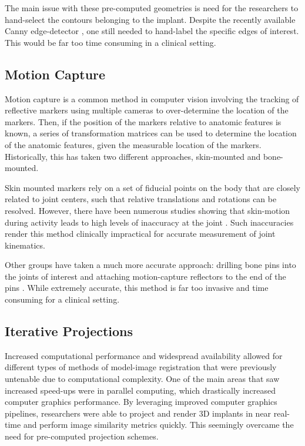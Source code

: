 The main issue with these pre-computed geometries is need for the researchers to hand-select the contours belonging to the implant.
Despite the recently available Canny edge-detector \cite{cannyComputationalApproachEdge1986}, one still needed to hand-label the specific edges of interest.
This would be far too time consuming in a clinical setting.


\subsection{Motion Capture}

Motion capture is a common method in computer vision involving the tracking of reflective markers using multiple cameras to over-determine the location of the markers.
Then, if the position of the markers relative to anatomic features is known, a series of transformation matrices can be used to determine the location of the anatomic features, given the measurable location of the markers.
Historically, this has taken two different approaches, skin-mounted and bone-mounted.

Skin mounted markers rely on a set of fiducial points on the body that are closely related to joint centers, such that relative translations and rotations can be resolved.
However, there have been numerous studies showing that skin-motion during activity leads to high levels of inaccuracy at the joint \cite{gaoInvestigationSoftTissue2008,garlingSofttissueArtefactAssessment2007,linEffectsSoftTissue2016,kuoInfluenceSoftTissue2011}.
Such inaccuracies render this method clinically impractical for accurate measurement of joint kinematics.

Other groups have taken a much more accurate approach: drilling bone pins into the joints of interest and attaching motion-capture reflectors to the end of the pins \cite{lafortuneThreedimensionalKinematicsHuman1992}.
While extremely accurate, this method is far too invasive and time consuming for a clinical setting.

\subsection{Iterative Projections}
Increased computational performance and widespread availability allowed for different types of methods of model-image registration that were previously untenable due to computational complexity.
One of the main areas that saw increased speed-ups were in parallel computing, which drastically increased computer graphics performance.
By leveraging improved computer graphics pipelines, researchers were able to project and render 3D implants in near real-time and perform image similarity metrics quickly.
This seemingly overcame the need for pre-computed projection schemes.

